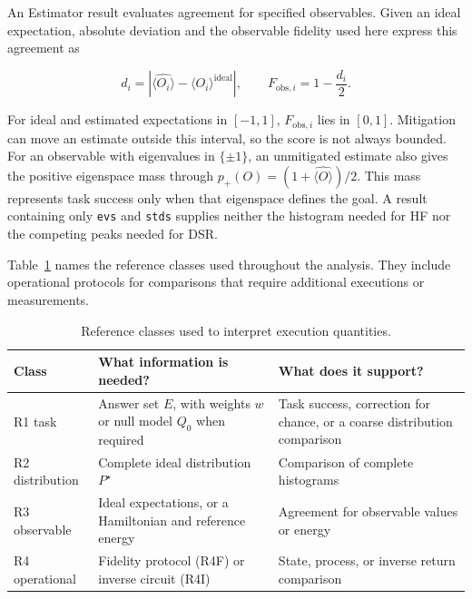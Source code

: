 \documentclass[10pt,conference]{IEEEtran}
\begin{document}
An Estimator result evaluates agreement for specified observables. Given an ideal expectation, absolute deviation and the observable fidelity used here express this agreement as

\begin{equation}
d_i=\left|\widehat{\langle O_i\rangle}-\langle O_i\rangle^{\mathrm{ideal}}\right|,
\qquad
F_{\mathrm{obs},i}=1-\frac{d_i}{2}.
\label{eq:observable-fidelity}
\end{equation}

For ideal and estimated expectations in $[-1,1]$, $F_{\mathrm{obs},i}$ lies in $[0,1]$. Mitigation can move an estimate outside this interval, so the score is not always bounded. For an observable with eigenvalues in $\{\pm1\}$, an unmitigated estimate also gives the positive eigenspace mass through $p_+(O)=(1+\widehat{\langle O\rangle})/2$. This mass represents task success only when that eigenspace defines the goal. A result containing only \texttt{evs} and \texttt{stds} supplies neither the histogram needed for HF nor the competing peaks needed for DSR.

Table~\ref{tab:references} names the reference classes used throughout the analysis. They include operational protocols for comparisons that require additional executions or measurements.

\begin{table}[ht]
\centering
\caption{Reference classes used to interpret execution quantities.}
\label{tab:references}
\renewcommand{\arraystretch}{1.15}
\begin{tabularx}{\columnwidth}{@{}l>{\raggedright\arraybackslash}p{}>{\raggedright\arraybackslash}X@{}}
\toprule
\textbf{Class} & \textbf{What information is needed?} & \textbf{What does it support?} \\
\midrule
R1 task & Answer set $E$, with weights $w$ or null model $Q_0$ when required
& Task success, correction for chance, or a coarse distribution comparison \\
R2 distribution & Complete ideal distribution $P^{\star}$
& Comparison of complete histograms \\
R3 observable & Ideal expectations, or a Hamiltonian and reference energy
& Agreement for observable values or energy \\
R4 operational & Fidelity protocol (R4F) or inverse circuit (R4I)
& State, process, or inverse return comparison \\
\bottomrule
\end{tabularx}
\end{table}
\end{document}
